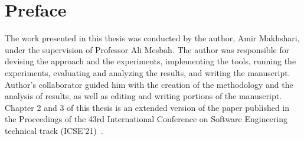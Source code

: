 
\chapter{Preface}

The work presented in this thesis was conducted by the author, Amir Makhshari, under the supervision of Professor Ali Mesbah. The author was responsible for devising the approach and the experiments, implementing the tools, running the experiments, evaluating and analyzing the results, and writing the manuscript. Author's collaborator guided him with the creation of the methodology and the analysis of results, as well as editing and writing portions of the manuscript. Chapter 2 and 3 of this thesis is an extended version of the paper published in the Proceedings of the 43rd International Conference on Software Engineering technical track (ICSE'21)~\cite{makhshari2021iot}.
